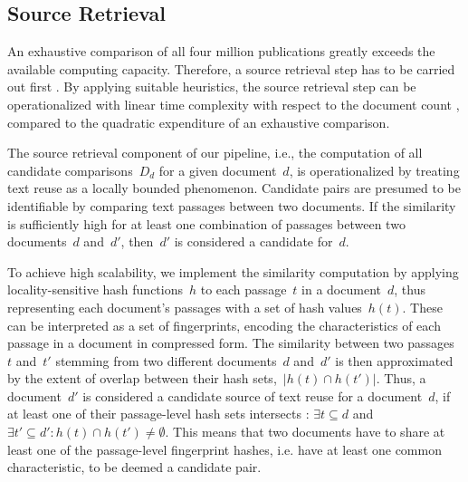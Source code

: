 \documentclass[fleqn,10pt]{wlscirep}
\begin{document}
\subsection*{Source Retrieval}

An exhaustive comparison of all four million publications greatly exceeds the available computing capacity. Therefore, a source retrieval step has to be carried out first \cite{hagen:2015e,hagen:2017e}. By applying suitable heuristics, the source retrieval step can be operationalized with linear time complexity with respect to the document count \cite{stein:2019c}, compared to the quadratic expenditure of an exhaustive comparison.

The source retrieval component of our pipeline, i.e., the computation of all candidate comparisons~$D_d$ for a given document~$d$, is operationalized by treating text reuse as a locally bounded phenomenon. Candidate pairs are presumed to be identifiable by comparing text passages between two documents. If the similarity is sufficiently high for at least one combination of passages between two documents~$d$ and~$d'$, then~$d'$ is considered a candidate for~$d$. 

To achieve high scalability, we implement the similarity computation by applying locality-sensitive hash functions~$h$ to each passage~$t$ in a document~$d$, thus representing each document's passages with a set of hash values~$h(t)$. These can be interpreted as a set of fingerprints, encoding the characteristics of each passage in a document in compressed form. The similarity between two passages~$t$ and~$t'$ stemming from two different documents~$d$ and~$d'$ is then approximated by the extent of overlap between their hash sets,~$|h(t)\cap h(t')|$. Thus, a document~$d'$ is considered a candidate source of text reuse for a document~$d$, if at least one of their passage-level hash sets intersects \cite{stein:2019c}: $\exists t \subseteq d$ and $\exists t' \subseteq d' : h(t) \cap h(t')\neq\emptyset$. This means that two documents have to share at least one of the passage-level fingerprint hashes, i.e. have at least one common characteristic, to be deemed a candidate pair.
\end{document}
